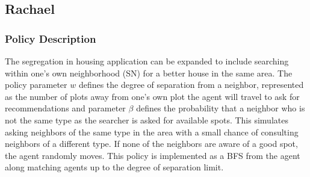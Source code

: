 \documentclass[11pt]{article}
\begin{document}
	\subsection{Rachael}
	\subsubsection{Policy Description}
	The segregation in housing application can be expanded to include searching within one's own neighborhood (SN) for a better house in the same area. The policy parameter $w$ defines the degree of separation from a neighbor, represented as the number of plots away from one's own plot the agent will travel to ask for recommendations and parameter $\beta$ defines the probability that a neighbor who is not the same type as the searcher is asked for available spots. This simulates asking neighbors of the same type in the area with a small chance of consulting neighbors of a different type. If none of the neighbors are aware of a good spot, the agent randomly moves. This policy is implemented as a BFS from the agent along matching agents up to the degree of separation limit.
	
\end{document}

